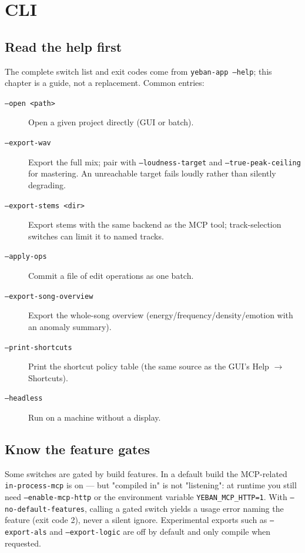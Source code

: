 \section{CLI}

\subsection{Read the help first}

The complete switch list and exit codes come from \texttt{yeban-app --help}; this
chapter is a guide, not a replacement. Common entries:

\begin{description}
  \item[\texttt{--open <path>}] Open a given project directly (GUI or batch).
  \item[\texttt{--export-wav}] Export the full mix; pair with \texttt{--loudness-target} and \texttt{--true-peak-ceiling} for mastering. An unreachable target fails loudly rather than silently degrading.
  \item[\texttt{--export-stems <dir>}] Export stems with the same backend as the MCP tool; track-selection switches can limit it to named tracks.
  \item[\texttt{--apply-ops}] Commit a file of edit operations as one batch.
  \item[\texttt{--export-song-overview}] Export the whole-song overview (energy/frequency/density/emotion with an anomaly summary).
  \item[\texttt{--print-shortcuts}] Print the shortcut policy table (the same source as the GUI's Help $\to$ Shortcuts).
  \item[\texttt{--headless}] Run on a machine without a display.
\end{description}

\subsection{Know the feature gates}

Some switches are gated by build features. In a default build the MCP-related
\texttt{in-process-mcp} is on — but "compiled in" is not "listening": at runtime you
still need \texttt{--enable-mcp-http} or the environment variable
\texttt{YEBAN\_MCP\_HTTP=1}. With \texttt{--no-default-features}, calling a gated
switch yields a usage error naming the feature (exit code 2), never a silent ignore.
Experimental exports such as \texttt{--export-als} and \texttt{--export-logic} are off
by default and only compile when requested.

